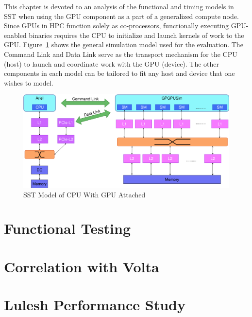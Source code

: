 This chapter is devoted to an analysis of the functional and timing models in
SST when using the GPU component as a part of a generalized compute node. Since
GPUs in HPC function solely as co-processors, functionally executing GPU-enabled
binaries requires the CPU to initialize and launch kernels of work to the GPU.
Figure~\ref{fig:sst_volta} shows the general simulation model used for the evaluation.
The Command Link and Data Link serve as the transport mechanism for the CPU (host)
to launch and coordinate work with the GPU (device). The other components in each
model can be tailored to fit any host and device that one wishes to model.

   \begin{figure}[!htb]
      \centering
      \setlength{\abovecaptionskip}{6pt plus 1pt minus 1pt}
      \includegraphics[width=.95\textwidth,keepaspectratio]{figures/sst_v100_model.png}
      \captionsetup{format=hang, justification=centering, width=.75\textwidth}
      \caption{SST Model of CPU With GPU Attached}
      \label{fig:sst_volta}
   \end{figure}

\section{Functional Testing}


\section{Correlation with Volta}


\section{Lulesh Performance Study}


